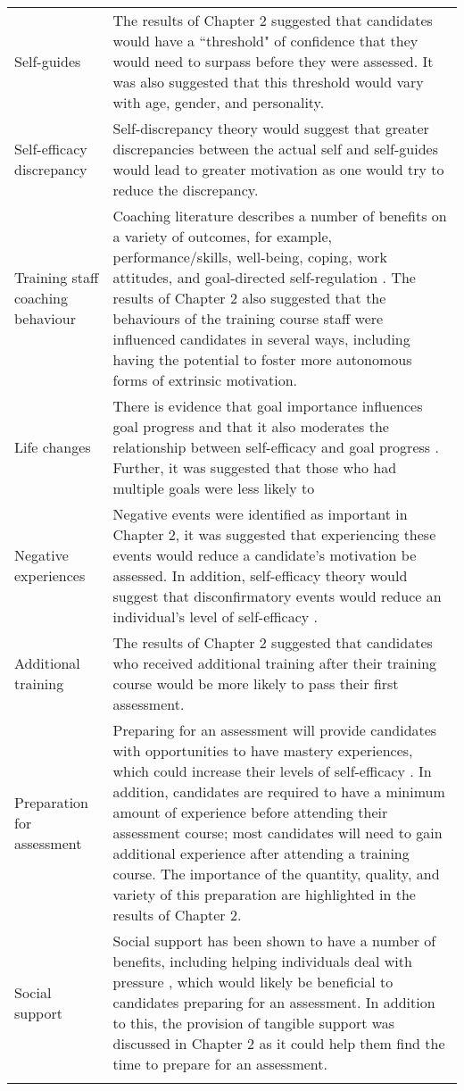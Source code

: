\documentclass[
  12pt,
  a4paper,
]{book}
\begin{document}
\begin{landscape}
\begin{longtable}[t]{>{\raggedright\arraybackslash}p{3cm}>{\raggedright\arraybackslash}p{21cm}}
\rowcolor{gray!6}  Self-guides & The results of Chapter 2 suggested that candidates would have a ``threshold" of confidence that they would need to surpass before they were assessed. It was also suggested that this threshold would vary with age, gender, and personality.\\
Self-efficacy discrepancy & Self-discrepancy theory \citep[cf.][]{Higgins1987} would suggest that greater discrepancies between the actual self and self-guides would lead to greater motivation as one would try to reduce the discrepancy.\\
\rowcolor{gray!6}  Training staff coaching behaviour & Coaching literature describes a number of benefits on a variety of outcomes, for example, performance/skills, well-being, coping, work attitudes, and goal-directed self-regulation \citep[e.g.,][]{Theeboom2014a, Weinberg2014}. The results of Chapter 2 also suggested that the behaviours of the training course staff were influenced candidates in several ways, including having the potential to foster more autonomous forms of extrinsic motivation.\\
\addlinespace
Life changes & There is evidence that goal importance influences goal progress and that it also moderates the relationship between self-efficacy and goal progress \citep[cf.][]{Beattie2015}. Further, it was suggested that those who had multiple goals were less likely to\\
\rowcolor{gray!6}  Negative experiences & Negative events were identified as important in Chapter 2, it was suggested that experiencing these events would reduce a candidate's motivation be assessed. In addition, self-efficacy theory would suggest that disconfirmatory events would reduce an individual's level of self-efficacy \citep{Bandura1977, Bandura1982}.\\
Additional training & The results of Chapter 2 suggested that candidates who received additional training after their training course would be more likely to pass their first assessment.\\
\rowcolor{gray!6}  Preparation for assessment & Preparing for an assessment will provide candidates with opportunities to have mastery experiences, which could increase their levels of self-efficacy \citep{Bandura1977, Bandura1982}. In addition, candidates are required to have a minimum amount of experience before attending their assessment course; most candidates will need to gain additional experience after attending a training course. The importance of the quantity, quality, and variety of this preparation are highlighted in the results of Chapter 2.\\
Social support & Social support has been shown to have a number of benefits, including helping individuals deal with pressure \citep{Freeman2011, Freeman2014}, which would likely be beneficial to candidates preparing for an assessment. In addition to this, the provision of tangible support was discussed in Chapter 2 as it could help them find the time to prepare for an assessment.\\*
\end{longtable}
\end{landscape}
\end{document}
